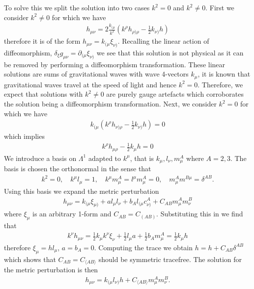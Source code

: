 \documentclass[10pt]{report}
\theoremstyle{definition}
\begin{document}
To solve this we split the solution into two cases $k^2 = 0$ and $k^2 \neq 0$. First we consider $k^2 \neq 0$ for which we have 
\begin{align}
    h_{\mu\nu} = 2 \frac{k_{(\mu}}{k^2} \left( k^\rho h_{\rho)\rho} - \frac{1}{2} k_{\nu)} h \right)
\end{align}
therefore it is of the form $h_{\mu\nu} = k_{(\mu} \xi_{\nu)}$. Recalling the linear action of diffeomorphism, $\delta_\xi g_{\mu\nu} = \partial_{(\mu} \xi_{\nu)}$ we see that this solution is not physical as it can be removed by performing a diffeomorphism transformation. These linear solutions are sums of gravitational waves with wave 4-vectors $k_\mu$, it is known that gravitational waves travel at the speed of light and hence $k^2 = 0$. Therefore, we expect that solutions with $k^2 \neq 0$ are purely gauge artefacts which corroborates the solution being a diffeomorphism transformation. Next, we consider $k^2 = 0$ for which we have 
\begin{align}
    k_{(\mu} \left( k^\rho h_{\nu)\rho} - \frac{1}{2} k_{\nu)} h \right) = 0
\end{align}
which implies 
\begin{align}
    k^\rho h_{\mu\rho} - \frac{1}{2} k_{\mu} h  = 0
\end{align}
We introduce a basis on $\Lambda^1$ adapted to $k^\mu$, that is $k_\mu, l_\nu, m^A_\mu$ where $A=2,3$. The basis is chosen the orthonormal in the sense that 
\begin{align}
    k^2 = 0, \quad k^\mu l_\mu = 1, \quad k^\mu m^A_\mu = l^\mu m^A_\mu = 0, \quad m^A_\mu m^{B\mu} = \delta^{AB}.
\end{align}
Using this basis we expand the metric perturbation 
\begin{align}
    h_{\mu\nu} = k_{(\mu} \xi_{\mu)} + a l_\mu l_\nu + b_A l_{(\mu} c^A_{\nu)} + C_{AB} m^A_{\mu} m^B_{\nu}
\end{align} 
where $\xi_\mu$ is an arbitrary 1-form and $C_{AB} = C_{(AB)}$. Substituting this in we find that 
\begin{align}
    k^\nu h_{\mu\nu} = \frac{1}{2} k_\mu k^\nu \xi_\nu + \frac{1}{2} l_\mu a + \frac{1}{2} b_A m^A_\mu = \frac{1}{2} k_\mu h
\end{align}
therefore $\xi_\mu = h l_\mu$, $a = b_A = 0$. Computing the trace we obtain $h = h + C_{AB} \delta^{AB}$ which shows that $C_{AB} = C_{\langle  AB \rangle}$ should be symmetric tracefree. The solution for the metric perturbation is then 
\begin{align}
    h_{\mu\nu} = k_{(\mu} l_{\nu)} h + C_{\langle  AB \rangle} m^A_\mu m^B_\nu.
\end{align}
\end{document}
